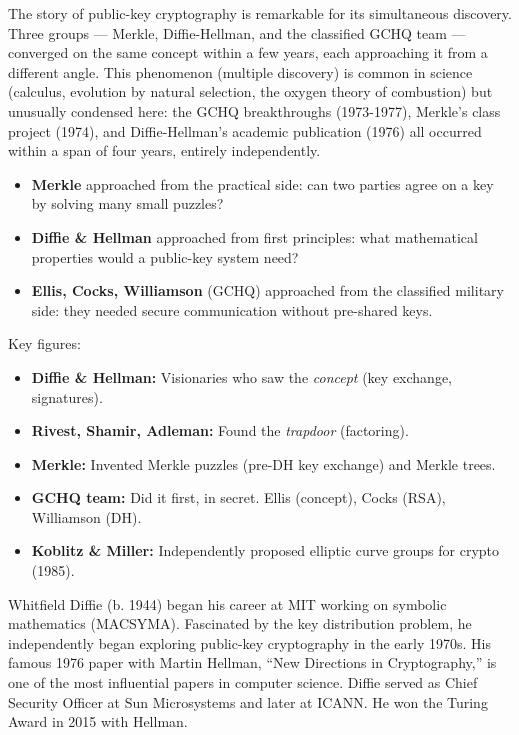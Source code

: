 The story of public-key cryptography is remarkable for its simultaneous discovery. Three groups — Merkle, Diffie-Hellman, and the classified GCHQ team — converged on the same concept within a few years, each approaching it from a different angle. This phenomenon (multiple discovery) is common in science (calculus, evolution by natural selection, the oxygen theory of combustion) but unusually condensed here: the GCHQ breakthroughs (1973-1977), Merkle's class project (1974), and Diffie-Hellman's academic publication (1976) all occurred within a span of four years, entirely independently.

\begin{itemize}
\item \textbf{Merkle} approached from the practical side: can two parties agree on a key by solving many small puzzles?
\item \textbf{Diffie \& Hellman} approached from first principles: what mathematical properties would a public-key system need?
\item \textbf{Ellis, Cocks, Williamson} (GCHQ) approached from the classified military side: they needed secure communication without pre-shared keys.
\end{itemize}

Key figures:

\begin{itemize}
\item \textbf{Diffie \& Hellman:} Visionaries who saw the \emph{concept} (key exchange, signatures).
\item \textbf{Rivest, Shamir, Adleman:} Found the \emph{trapdoor} (factoring).
\item \textbf{Merkle:} Invented Merkle puzzles (pre-DH key exchange) and Merkle trees.
\item \textbf{GCHQ team:} Did it first, in secret. Ellis (concept), Cocks (RSA), Williamson (DH).
\item \textbf{Koblitz \& Miller:} Independently proposed elliptic curve groups for crypto (1985).
\end{itemize}

Whitfield Diffie (b. 1944) began his career at MIT working on symbolic mathematics (MACSYMA). Fascinated by the key distribution problem, he independently began exploring public-key cryptography in the early 1970s. His famous 1976 paper with Martin Hellman, ``New Directions in Cryptography,'' is one of the most influential papers in computer science. Diffie served as Chief Security Officer at Sun Microsystems and later at ICANN. He won the Turing Award in 2015 with Hellman.

